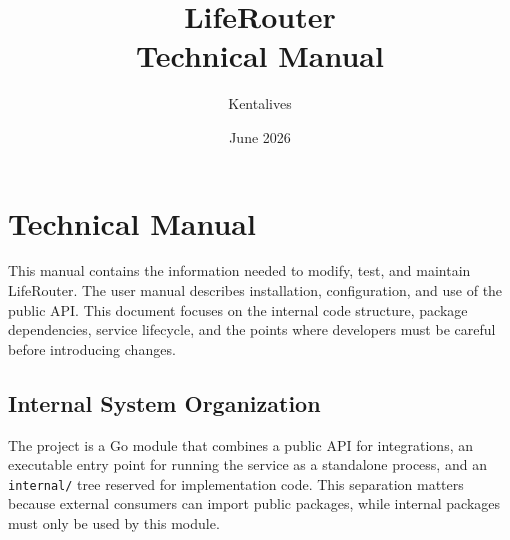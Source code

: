 \documentclass[12pt,a4paper]{report}
\title{LifeRouter\\Technical Manual}
\author{Kentalives}
\date{June 2026}
\begin{document}
\maketitle
\setcounter{page}{2}
\tableofcontents
\clearpage
{}

\chapter{Technical Manual}

This manual contains the information needed to modify, test, and maintain LifeRouter.
 The user manual describes installation, configuration,
and use of the public API. This document focuses on the internal code structure,
package dependencies, service lifecycle, and the points where developers must be
careful before introducing changes.

\section{Internal System Organization}

The project is a Go module that combines a public API for integrations, an
executable entry point for running the service as a standalone process, and an
\texttt{internal/} tree reserved for implementation code. This separation matters
because external consumers can import public packages, while internal packages
must only be used by this module.
\end{document}
